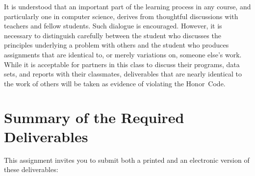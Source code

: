 \noindent It is understood that an important part of the learning process in any course, and particularly one in
computer science, derives from thoughtful discussions with teachers and fellow students.  Such dialogue is encouraged.
However, it is necessary to distinguish carefully between the student who discusses the principles underlying a problem
with others and the student who produces assignments that are identical to, or merely variations on, someone else's
work. While it is acceptable for partners in this class to discuss their programs, data sets, and reports with their
classmates, deliverables that are nearly identical to the work of others will be taken as evidence of violating the
\mbox{Honor Code}.

\section*{Summary of the Required Deliverables}

This assignment invites you to submit both a printed and an electronic version of these deliverables:

